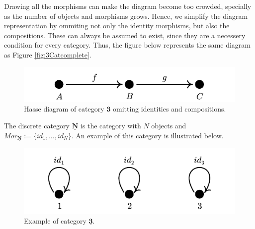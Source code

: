 \begin{example}
Drawing all the morphisms can make the diagram become too crowded, specially
as the number of objects and morphisms grows. Hence, we simplify the
diagram representation by ommiting not only the identity morphisms, but also
the compositions. These can always be assumed to exist, since they are a necessery
condition for every category.
Thus, the figure below represents the same diagram as Figure \ref{fig:3Catcomplete}.

\begin{figure}[H]
  \begin{center}
    \includegraphics{./notebooks/3Catsimple}
  \end{center}
  \caption{Hasse diagram of category $\bm 3$ omitting identities and compositions.}
  \label{fig:3Catsimple}
\end{figure}

\end{example}

\begin{example}
  The discrete category $\mathbf{\underline{N}}$ is the category with $N$ objects
  and $Mor_{\mathbf{\underline{N}}} := \{id_1,...,id_N\}$. An example of this category is
  illustrated below.

  \begin{figure}[H]
    \begin{center}
      \includegraphics{./notebooks/3Discrete.pdf}
    \end{center}
    \caption{Example of category $\mathbf{\underline{3}}$.}
    \label{fig:3Discrete}
  \end{figure}
\end{example}

